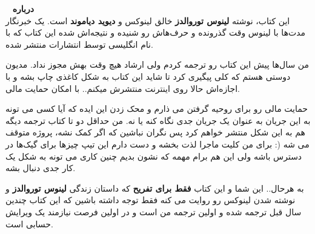 \ 
\vfill
\noindent
\textbf{\Huge درباره} \\

این کتاب، نوشته \textbf{لینوس توروالدز} خالق لینوکس و \textbf{دیوید
  دیاموند} است. یک خبرنگار مدت‌ها با لینوس وقت گذرونده و حرف‌هاش رو
شنیده و نتیجه‌اش شده این کتاب که با نام انگلیسی \lr{Just For Fun} توسط
انتشارات \lr{TEXERE} منتشر شده.

من سال‌ها پیش این کتاب رو ترجمه کردم ولی ارشاد هیچ وقت بهش مجوز
نداد. مدیون دوستی هستم که کلی پیگیری کرد تا شاید این کتاب به شکل کاغذی
چاپ بشه و با اجازه‌اش حالا روی اینترنت منتشرش میکنم.. با امکان حمایت
مالی.

حمایت مالی رو برای روحیه گرفتن می ذارم و محک زدن این ایده که آیا کسی
می تونه به این جریان به عنوان یک جریان جدی نگاه کنه یا نه. من حداقل دو
تا کتاب ترجمه دیگه هم به این شکل منتشر خواهم کرد پس نگران نباشین که
اگر کمک نشه، پروژه متوقف می شه (: برای من کلیت ماجرا لذت بخشه و دست
دارم این تیپ چیزها برای گیک‌ها در دسترس باشه ولی این هم برام مهمه که
نشون بدیم چنین کاری می تونه به شکل یک کار جدی دنبال بشه.

به هرحال.. این شما و این کتاب \textbf{فقط برای تفریح} که داستان زندگی
\textbf{لینوس توروالدز} و نوشته شدن لینوکس رو روایت می کنه فقط توجه
داشته باشین که این کتاب چندین سال قبل ترجمه شده و اولین ترجمه من است و
در اولین فرصت نیازمند یک ویرایش حسابی است.
\vfill
